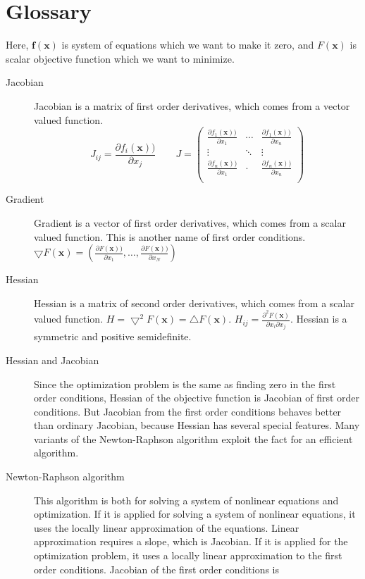 \documentclass[12pt]{article}
\def\pdiff#1#2{\frac{\partial #1}{\partial #2}}
\def\xb{{\mathbf{x}}}
\def\fb{{\mathbf{f}}}
\begin{document}
\section{Glossary}
Here, $\fb(\xb)$ is system of equations which we want to make it zero, and $F(\xb)$ is scalar
objective function which we want to minimize. 
\begin{description}
    \item[Jacobian] Jacobian is a matrix of first order derivatives, which comes from a vector 
    valued function. \[
    J_{ij} =\pdiff{f_i(\xb))}{x_j}\qquad J = \begin{pmatrix}
    \pdiff{f_1(\xb))}{x_1} & \cdots & \pdiff{f_1(\xb))}{x_n} \\
    \vdots & \ddots & \vdots \\
    \pdiff{f_n(\xb))}{x_1} & \cdot
 & \pdiff{f_n(\xb))}{x_n} \\
     \end{pmatrix}
    \]
    \item[Gradient] Gradient is a vector of first order derivatives, which comes from a scalar
      valued function. This is another name of first order conditions.  $\bigtriangledown F(\xb) =
      (\pdiff{F(\xb))}{x_1},\dots,\pdiff{F(\xb))}{x_N} )$
    \item[Hessian] Hessian is a matrix of second order derivatives, which comes from a scalar
      valued function.  $H = \bigtriangledown^2 F(\xb) =\bigtriangleup F(\xb)$. $
      H_{ij}=\frac{\partial^2 F(\xb)}{\partial x_i \partial x_j}$. Hessian is a symmetric and
      positive semidefinite.  
    \item[Hessian and Jacobian] Since the optimization problem is the same as finding zero in the first
      order conditions, Hessian of the objective function is Jacobian of first order
      conditions. But Jacobian from the first order conditions behaves better than ordinary
      Jacobian, because Hessian has several special features. Many variants of the Newton-Raphson
      algorithm exploit the fact for an efficient algorithm. 
    \item[Newton-Raphson algorithm] This algorithm is both for solving a system of nonlinear
      equations and optimization. If it is applied for solving a system of nonlinear equations, it uses the locally linear approximation of the equations. Linear approximation requires a slope,
      which is Jacobian. If it is applied for the optimization problem, it uses a locally linear
      approximation to the first order conditions. Jacobian of the first order conditions is

\end{description}
\end{document}
